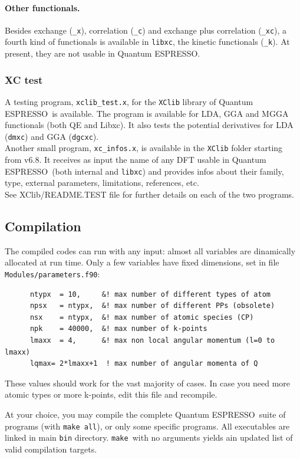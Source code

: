 \documentclass[12pt,a4paper]{article}
\def\qe{{\sc Quantum ESPRESSO}}
\def\make{\texttt{make}}
\def\libxc{\texttt{libxc}}
\begin{document}
\paragraph{Other functionals.} Besides exchange (\texttt{\_x}), correlation (\texttt{\_c}) and exchange plus correlation (\texttt{\_xc}), a fourth kind of functionals is available in \libxc, the kinetic functionals (\texttt{\_k}). At present, they are not usable in \qe.
%
\subsubsection{XC test}
\label{SubSec:XCtest}
A testing program, \texttt{xclib\_test.x}, for the \texttt{XClib} library of \qe\ is available. The program is available for LDA, GGA and MGGA functionals (both QE and Libxc). It also tests the potential derivatives for LDA (\texttt{dmxc}) and GGA (\texttt{dgcxc}).\\
Another small program, \texttt{xc\_infos.x}, is available in the \texttt{XClib} folder starting from v6.8. It receives as input the name of any DFT usable in \qe\ (both internal and \libxc) and provides infos about their family, type, external parameters, limitations, references, etc.\\
See XClib/README.TEST file for further details on each of the two programs.

\subsection{Compilation}
\label{SubSec:Compilation}

The compiled codes can run with any input: almost all variables are
dinamically allocated at run time. Only a few variables have fixed
dimensions, set in file \texttt{Modules/parameters.f90}:
\begin{verbatim}
      ntypx  = 10,     &! max number of different types of atom
      npsx   = ntypx,  &! max number of different PPs (obsolete)
      nsx    = ntypx,  &! max number of atomic species (CP)
      npk    = 40000,  &! max number of k-points
      lmaxx  = 4,      &! max non local angular momentum (l=0 to lmaxx)
      lqmax= 2*lmaxx+1  ! max number of angular momenta of Q
\end{verbatim}
These values should work for the vast majority of cases. In case you need
more atomic types or more k-points, edit this file and recompile.

At your choice, you may compile the complete \qe\ suite of programs
(with \texttt{make all}), or only some specific programs.
All executables are linked in main \texttt{bin} directory.
\make\ with no arguments yields ain updated list of valid compilation targets.
\end{document}
